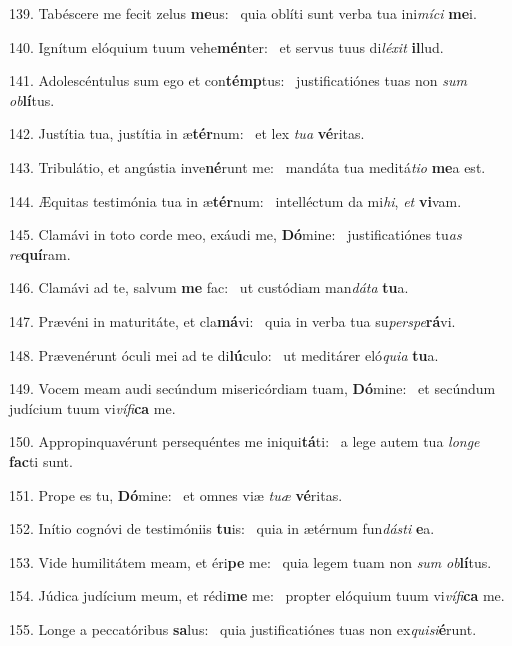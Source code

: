 139. Tabéscere me fecit zelus \textbf{me}us: \ast\  quia oblíti sunt verba tua ini\textit{mí}\textit{ci} \textbf{me}i.\

140. Ignítum elóquium tuum vehe\textbf{mén}ter: \ast\  et servus tuus di\textit{lé}\textit{xit} \textbf{il}lud.\

141. Adolescéntulus sum ego et con\textbf{témp}tus: \ast\  justificatiónes tuas non \textit{sum} \textit{ob}\textbf{lí}tus.\

142. Justítia tua, justítia in æ\textbf{tér}num: \ast\  et lex \textit{tu}\textit{a} \textbf{vé}ritas.\

143. Tribulátio, et angústia inve\textbf{né}runt me: \ast\  mandáta tua meditá\textit{ti}\textit{o} \textbf{me}a est.\

144. Æquitas testimónia tua in æ\textbf{tér}num: \ast\  intelléctum da mi\textit{hi}, \textit{et} \textbf{vi}vam.\

145. Clamávi in toto corde meo, exáudi me, \textbf{Dó}mine: \ast\  justificatiónes tu\textit{as} \textit{re}\textbf{quí}ram.\

146. Clamávi ad te, salvum \textbf{me} fac: \ast\  ut custódiam man\textit{dá}\textit{ta} \textbf{tu}a.\

147. Prævéni in maturitáte, et cla\textbf{má}vi: \ast\  quia in verba tua su\textit{per}\textit{spe}\textbf{rá}vi.\

148. Prævenérunt óculi mei ad te di\textbf{lú}culo: \ast\  ut meditárer eló\textit{qui}\textit{a} \textbf{tu}a.\

149. Vocem meam audi secúndum misericórdiam tuam, \textbf{Dó}mine: \ast\  et secúndum judícium tuum vi\textit{ví}\textit{fi}\textbf{ca} me.\

150. Appropinquavérunt persequéntes me iniqui\textbf{tá}ti: \ast\  a lege autem tua \textit{lon}\textit{ge} \textbf{fac}ti sunt.\

151. Prope es tu, \textbf{Dó}mine: \ast\  et omnes viæ \textit{tu}\textit{æ} \textbf{vé}ritas.\

152. Inítio cognóvi de testimóniis \textbf{tu}is: \ast\  quia in ætérnum fun\textit{dás}\textit{ti} \textbf{e}a.\

153. Vide humilitátem meam, et éri\textbf{pe} me: \ast\  quia legem tuam non \textit{sum} \textit{ob}\textbf{lí}tus.\

154. Júdica judícium meum, et rédi\textbf{me} me: \ast\  propter elóquium tuum vi\textit{ví}\textit{fi}\textbf{ca} me.\

155. Longe a peccatóribus \textbf{sa}lus: \ast\  quia justificatiónes tuas non ex\textit{qui}\textit{si}\textbf{é}runt.\

